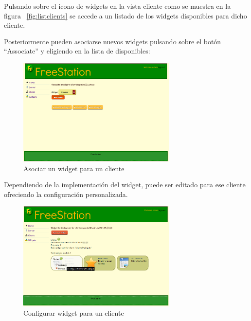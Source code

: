     Pulsando sobre el icono de widgets en la vista cliente como se muestra en la
    figura ~\ref{fig:listclients} se accede a un listado de los widgets
    disponibles para dicho cliente.
        
    Posteriormente pueden asociarse nuevos widgets pulsando sobre el botón
    ``Associate'' y eligiendo en la lista de disponibles:
    
    \begin{figure}[ht]
        \begin{center}
            \includegraphics[width=300px]{src/img/associate-widget-client.png}
            \caption[Asociar un widget para un cliente]
              {Asociar un widget para un cliente}
        \end{center}
    \end{figure}
    
    Dependiendo de la implementación del widget, puede ser editado para ese
    cliente ofreciendo la configuración personalizada.
    
    \begin{figure}[ht]
        \begin{center}
            \includegraphics[width=300px]{src/img/configure-widget-client.png}
            \caption[Configurar widget para un cliente]
              {Configurar widget para un cliente}
        \end{center}
    \end{figure}
    
